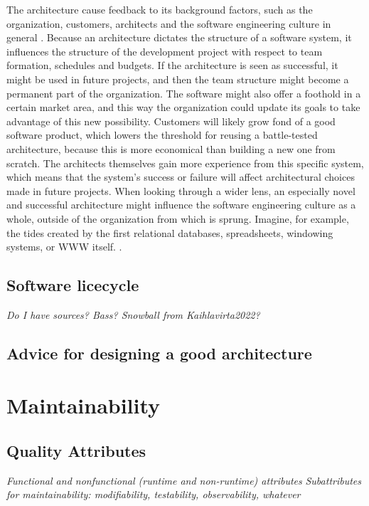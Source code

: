 \documentclass[utf8,english]{gradu3}
\newcommand{\tmp}[1]{\textit{{#1}}}
\begin{document}
The architecture cause feedback to its background factors, such as the
organization, customers, architects and the software engineering culture in
general \parencite{Bass1998}. Because an architecture dictates the structure of a software
system, it influences the structure of the development project with respect to
team formation, schedules and budgets. If the architecture is seen as
successful, it might be used in future projects, and then the team structure
might become a permanent part of the organization. The software might also offer
a foothold in a certain market area, and this way the organization could update
its goals to take advantage of this new possibility. Customers will likely grow
fond of a good software product, which lowers the threshold for reusing a
battle-tested architecture, because this is more economical than building a new
one from scratch. The architects themselves gain more experience from this
specific system, which means that the system's success or failure will affect
architectural choices made in future projects. When looking through a wider
lens, an especially novel and successful architecture might influence the
software engineering culture as a whole, outside of the organization from which
is sprung. Imagine, for example, the tides created by the first relational
databases, spreadsheets, windowing systems, or WWW itself. \parencite[10-11]{Bass1998}.


\subsection{Software licecycle}
\tmp{Do I have sources? Bass? Snowball from Kaihlavirta2022?}

\subsection{Advice for designing a good architecture}



\section{Maintainability}

\subsection{Quality Attributes}

\tmp{Functional and nonfunctional (runtime and non-runtime) attributes}
\tmp{Subattributes for maintainability: modifiability, testability, observability, whatever}
\end{document}
